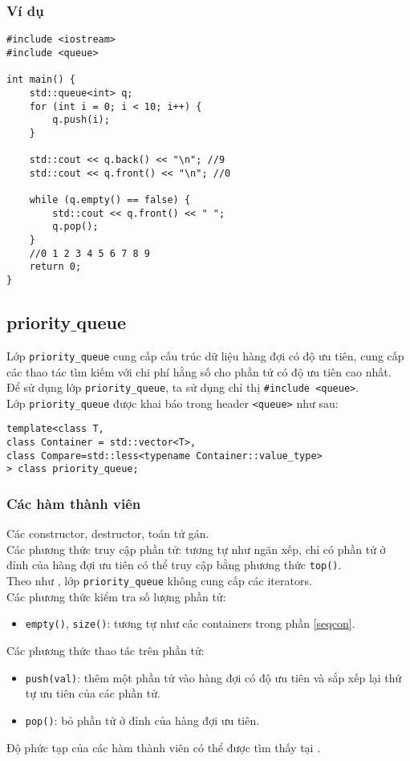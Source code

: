 \subsubsection{Ví dụ}
\begin{lstlisting}
#include <iostream>
#include <queue>

int main() {
    std::queue<int> q;
    for (int i = 0; i < 10; i++) {
        q.push(i); 
    }
    
    std::cout << q.back() << "\n"; //9
    std::cout << q.front() << "\n"; //0
    
    while (q.empty() == false) {
        std::cout << q.front() << " ";
        q.pop();
    }
    //0 1 2 3 4 5 6 7 8 9
    return 0;
}
\end{lstlisting}
\subsection{priority$\_$queue}
Lớp \lstinline{priority_queue} cung cấp cấu trúc dữ liệu hàng đợi có độ ưu tiên, cung cấp các thao tác tìm kiếm với chi phí hằng số cho phần tử có độ ưu tiên cao nhất.\\
Để sử dụng lớp \lstinline{priority_queue}, ta sử dụng chỉ thị \lstinline{#include <queue>}.\\
Lớp \lstinline{priority_queue} được khai báo trong header \lstinline{<queue>} như sau: \cite{pqueue}
\begin{lstlisting}
template<class T, 
class Container = std::vector<T>, 
class Compare=std::less<typename Container::value_type>
> class priority_queue;
\end{lstlisting}
\subsubsection{Các hàm thành viên}
Các constructor, destructor, toán tử gán.\\
Các phương thức truy cập phần tử: tương tự như ngăn xếp, chỉ có phần tử ở đỉnh của hàng đợi ưu tiên  có thể truy cập bằng phương thức \lstinline{top()}.\\
Theo như \cite{pqueue}, lớp \lstinline{priority_queue} không cung cấp các iterators.\\
Các phương thức kiểm tra số lượng phần tử:
\begin{itemize}
    \item \lstinline{empty()}, \lstinline{size()}: tương tự như các containers trong phần \ref{seqcon}.
\end{itemize}
Các phương thức thao tác trên phần tử:
\begin{itemize}
    \item \lstinline{push(val)}: thêm một phần tử vào hàng đợi có độ ưu tiên và sắp xếp lại thứ tự ưu tiên của các phần tử.
    \item \lstinline{pop()}: bỏ phần tử ở đỉnh của hàng đợi ưu tiên.
\end{itemize}
Độ phức tạp của các hàm thành viên có thể được tìm thấy tại \cite{pqueue}.

